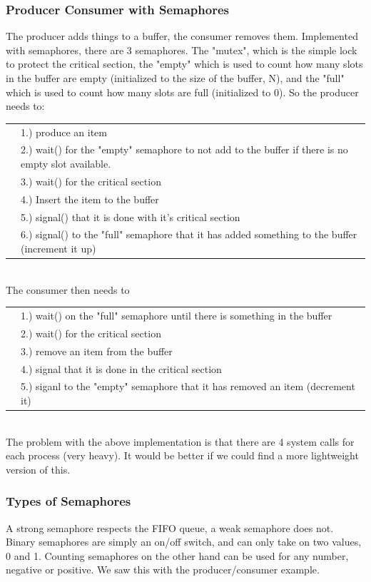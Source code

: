 \documentclass[12pt]{article}
\theoremstyle{definition}
\begin{document}
\subsubsection{Producer Consumer with Semaphores}
The producer adds things to a buffer, the consumer removes them. Implemented with semaphores, there are 3 semaphores. The "mutex", which is the simple lock to protect the critical section, the "empty" which is used to count how many slots in the buffer are empty (initialized to the size of the buffer, N), and the "full" which is used to count how many slots are full (initialized to 0). So the producer needs to:\\
\begin{tabular}{l l}
	&1.) produce an item \\
	&2.) wait() for the "empty" semaphore to not add to the buffer if there is no empty slot available.\\
	&3.) wait() for the critical section\\
	&4.) Insert the item to the buffer\\
	&5.) signal() that it is done with it's critical section\\
	&6.) signal() to the "full" semaphore that it has added something to the buffer (increment it up)
	
\end{tabular}\\
The consumer then needs to\\
\begin{tabular}{l l}
	&1.) wait() on the "full" semaphore until there is something in the buffer \\
	&2.) wait() for the critical section \\
	&3.) remove an item from the buffer \\
	&4.) signal that it is done in the critical section \\
	&5.) siganl to the "empty" semaphore that it has removed an item (decrement it)\\
\end{tabular}\\
The problem with the above implementation is that there are 4 system calls for each process (very heavy). It would be better if we could find a more lightweight version of this.
\\ \linebreak
\subsubsection{Types of Semaphores}
A strong semaphore respects the FIFO queue, a weak semaphore does not.
\\ \linebreak
Binary semaphores are simply an on/off switch, and can only take on two values, 0 and 1. Counting semaphores on the other hand can be used for any number, negative or positive. We saw this with the producer/consumer example.
\end{document}
